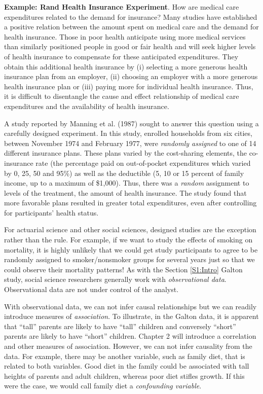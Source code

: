 \linejed {}

\textbf{Example: Rand Health Insurance Experiment}. How are medical
care expenditures related to the demand for insurance? Many studies
have established a positive relation between the amount spent on
medical care and the demand for health insurance. Those in poor
health anticipate using more medical services than similarly
positioned people in good or fair health and will seek higher levels
of health insurance to compensate for these anticipated
expenditures. They obtain this additional health insurance by (i)
selecting a more generous health insurance plan from an employer,
(ii) choosing an employer with a more generous health insurance plan
or (iii) paying more for individual health insurance. Thus, it is
difficult to disentangle the cause and effect relationship of
medical care expenditures and the availability of health insurance.

A study reported by Manning et al. (1987) sought to answer this
question using a carefully designed experiment. In this study,
enrolled households from six cities, between November 1974 and
February 1977, were \emph{randomly assigned} to one of 14 different
insurance plans. These plans varied by the cost-sharing elements,
the co-insurance rate (the percentage paid on out-of-pocket
expenditures which varied by 0, 25, 50 and 95\%) as well as the
deductible (5, 10 or 15 percent of family income, up to a maximum of
\$1,000). Thus, there was a \emph{random} assignment to levels of
the treatment, the amount of health insurance. The study found that
more favorable plans resulted in greater total expenditures, even
after controlling for participants' health status.

\linejed

\bigskip

For actuarial science and other social sciences, designed studies
are the exception rather than the rule. For example, if we want to
study the effects of smoking on mortality, it is highly unlikely
that we could get study participants to agree to be randomly
assigned to smoker/nonsmoker groups for several years just so that
we could observe their mortality patterns! As with the Section
\ref{S1:Intro} Galton study, social science researchers generally
work with \emph{observational data}. Observational data are not
under control of the analyst.

With observational data, we can not infer causal relationships but
we can readily introduce measures of \emph{association}. To
illustrate, in the Galton data, it is apparent that ``tall'' parents
are likely to have ``tall'' children and conversely ``short''
parents are likely to have ``short'' children. Chapter 2 will
introduce a correlation and other measures of association. However,
we can not infer causality from the data. For example, there may be
another variable, such as family diet, that is related to both
variables. Good diet in the family could be associated with tall
heights of parents and adult children, whereas poor diet stifles
growth. If this were the case, we would call family diet a
\emph{confounding variable}.

